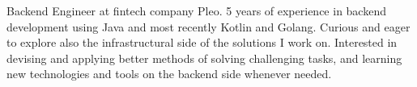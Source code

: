 

\begin{cvparagraph}
	
	Backend Engineer at fintech company Pleo. 5 years of experience in backend development using Java and most recently Kotlin and Golang. Curious and eager to explore also the infrastructural side of the solutions I work on. Interested in devising and applying better methods of solving challenging tasks, and learning new technologies and tools on the backend side whenever needed.
\end{cvparagraph}